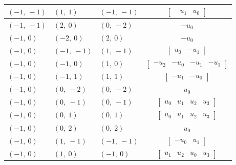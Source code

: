 \documentclass[11pt]{article}
\theoremstyle{definition}
\begin{document}
\begin{longtable}{|l|l|l|c|}
    \hline
    $\left( -1, \  -1\right)$ & $\left( 1, \  1\right)$ & $\left( -1, \  -1\right)$ & $\left[\begin{matrix}- u_{1} & u_{0}\end{matrix}\right]$ \\
    \hline
    $\left( -1, \  -1\right)$ & $\left( 2, \  0\right)$ & $\left( 0, \  -2\right)$ & $- u_{0}$ \\
    \hline
    $\left( -1, \  0\right)$ & $\left( -2, \  0\right)$ & $\left( 2, \  0\right)$ & $- u_{0}$ \\
    \hline
    $\left( -1, \  0\right)$ & $\left( -1, \  -1\right)$ & $\left( 1, \  -1\right)$ & $\left[\begin{matrix}u_{0} & - u_{1}\end{matrix}\right]$ \\
    \hline
    $\left( -1, \  0\right)$ & $\left( -1, \  0\right)$ & $\left( 1, \  0\right)$ & $\left[\begin{matrix}- u_{2} & - u_{0} & - u_{1} & - u_{3}\end{matrix}\right]$ \\
    \hline
    $\left( -1, \  0\right)$ & $\left( -1, \  1\right)$ & $\left( 1, \  1\right)$ & $\left[\begin{matrix}- u_{1} & - u_{0}\end{matrix}\right]$ \\
    \hline
    $\left( -1, \  0\right)$ & $\left( 0, \  -2\right)$ & $\left( 0, \  -2\right)$ & $u_{0}$ \\
    \hline
    $\left( -1, \  0\right)$ & $\left( 0, \  -1\right)$ & $\left( 0, \  -1\right)$ & $\left[\begin{matrix}u_{0} & u_{1} & u_{2} & u_{3}\end{matrix}\right]$ \\
    \hline
    $\left( -1, \  0\right)$ & $\left( 0, \  1\right)$ & $\left( 0, \  1\right)$ & $\left[\begin{matrix}u_{0} & u_{1} & u_{2} & u_{3}\end{matrix}\right]$ \\
    \hline
    $\left( -1, \  0\right)$ & $\left( 0, \  2\right)$ & $\left( 0, \  2\right)$ & $u_{0}$ \\
    \hline
    $\left( -1, \  0\right)$ & $\left( 1, \  -1\right)$ & $\left( -1, \  -1\right)$ & $\left[\begin{matrix}- u_{0} & u_{1}\end{matrix}\right]$ \\
    \hline
    $\left( -1, \  0\right)$ & $\left( 1, \  0\right)$ & $\left( -1, \  0\right)$ & $\left[\begin{matrix}u_{1} & u_{2} & u_{0} & u_{3}\end{matrix}\right]$ \\

\end{longtable}
\end{document}
